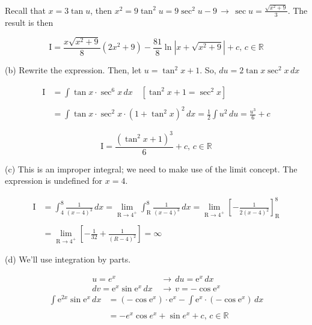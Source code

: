 \documentclass{article}
\begin{document}
\hfill

\noindent Recall that $x=3\tan u$, then $\displaystyle x^2 = 9\tan^2u = 9\sec^2u-9\,\rightarrow\, \sec u =\frac{\sqrt{x^2+9}}3$. The result is then

\begin{equation*}
\boxed{\mathrm{I}=\frac{x\sqrt{x^2+9}}8\left(2x^2+9\right)-\frac{81}8\ln\left|x+\sqrt{x^2+9}\right| + c,\,c\in\mathbb{R}}
\end{equation*}

\hfill

\noindent (b) Rewrite the expression. Then, let $u =\tan^2x + 1$. So, $du=2\tan x \sec^2 x\,dx$

\begin{align*}
\mathrm{I} &=\int\tan x \cdot\sec^6 x\, dx \quad\left[\tan^2x+1=\sec^2x\right] \\\\ &= \int\tan x\cdot\sec^2x\cdot(1+\tan^2x)^2 \,dx=\frac12\int u^2 \,du  = \frac{u^3}6 + c
\end{align*}

\begin{equation*}
\boxed{\mathrm{I}=\frac{(\tan^2x+1)^3}{6} + c, \, c\in \mathbb{R}}
\end{equation*}

\noindent (c) This is an improper integral; we need to make use of the limit concept. The expression is undefined for $x=4$.

\begin{align*}
\mathrm{I} &= \int_4^8\frac1{(x-4)^3}\,dx = \lim_{\mathrm{R}\to4^+}\int_\mathrm{R}^8\frac1{(x-4)^3}\,dx=\lim_{\mathrm{R}\to4^+} \left[-\frac1{2(x-4)^2}\right]_\mathrm{R}^8\\\\&=\lim_{\mathrm{R}\to4^+} \left[-\frac1{32} + \frac1{(R-4)^2}\right]=\boxed\infty
\end{align*}

\hfill

\noindent (d) We'll use integration by parts.

\begin{align*}u=e^x\,&\rightarrow\,du=\mathrm{e}^x\,dx \\dv=\mathrm{e}^x\sin \mathrm{e}^x \,dx \,&\rightarrow\,v=-\cos\mathrm{e}^x\end{align*}
\begin{align*}\int\mathrm{e}^{2x}\sin\mathrm{e}^x\,dx&=(-\cos\mathrm{e}^x)\cdot\mathrm{e}^x-\int\mathrm{e}^x\cdot(-\cos\mathrm{e}^x)\,dx\\\\&=\boxed{-e^x\cos e^x +\sin e^x + c, \,c \in \mathbb{R}} \end{align*}
\end{document}
